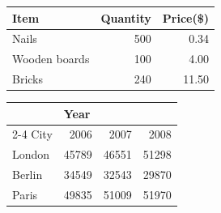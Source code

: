 \documentclass[a4paper,12pt]{article}
\begin{document}
\begin{tabular}{l|r|r}
  Item         & Quantity & Price(\$) \\
  \hline
  Nails        &      500 &      0.34 \\
  Wooden boards &     100 &      4.00 \\
  Bricks       &      240 &     11.50 \\
\end{tabular}

\bigskip

\begin{tabular}{l|rrr}
       & \multicolumn{3}{l}{Year} \\
  \cline{2-4}
  City & 2006  & 2007  & 2008  \\
  \hline
  London & 45789 & 46551 & 51298 \\
  Berlin & 34549 & 32543 & 29870 \\
  Paris  & 49835 & 51009 & 51970 \\
\end{tabular}
\end{document}
